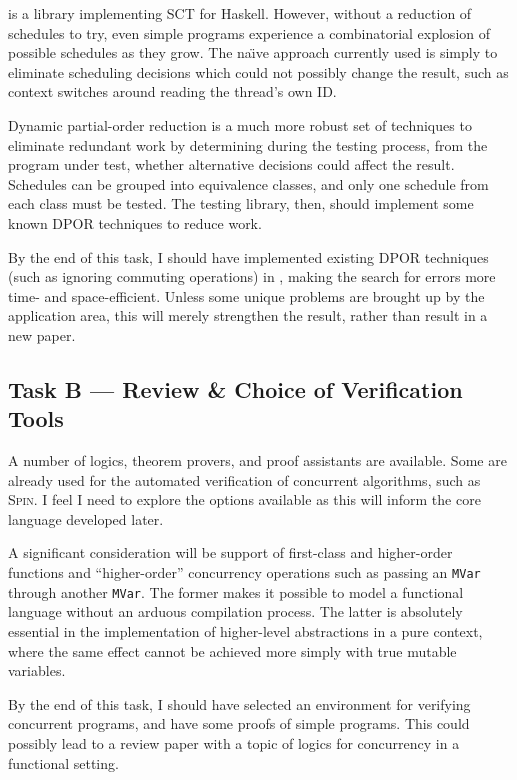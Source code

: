 \dejafu{} is a library implementing SCT for Haskell. However, without
a reduction of schedules to try, even simple programs experience a
combinatorial explosion of possible schedules as they grow. The
na\"{\i}ve approach currently used is simply to eliminate scheduling
decisions which could not possibly change the result, such as context
switches around reading the thread's own ID.

Dynamic partial-order reduction is a much more robust set of
techniques to eliminate redundant work by determining during the
testing process, from the program under test, whether alternative
decisions could affect the result. Schedules can be grouped into
equivalence classes, and only one schedule from each class must be
tested. The testing library, then, should implement some known DPOR
techniques to reduce work.

By the end of this task, I should have implemented existing DPOR
techniques (such as ignoring commuting operations) in \dejafu{},
making the search for errors more time- and space-efficient. Unless
some unique problems are brought up by the application area, this will
merely strengthen the \dejafu{} result, rather than result in a new
paper.

\subsection*{Task B --- Review \& Choice of Verification Tools}
\label{sec:proposal-tasks-tools}

A number of logics, theorem provers, and proof assistants are
available. Some are already used for the automated verification of
concurrent algorithms, such as \textsc{Spin}. I feel I need to explore
the options available as this will inform the core language developed
later.

A significant consideration will be support of first-class and
higher-order functions and ``higher-order'' concurrency operations
such as passing an \verb|MVar| through another \verb|MVar|. The former
makes it possible to model a functional language without an arduous
compilation process. The latter is absolutely essential in the
implementation of higher-level abstractions in a pure context, where
the same effect cannot be achieved more simply with true mutable
variables.

By the end of this task, I should have selected an environment for
verifying concurrent programs, and have some proofs of simple
programs. This could possibly lead to a review paper with a topic of
logics for concurrency in a functional setting.

